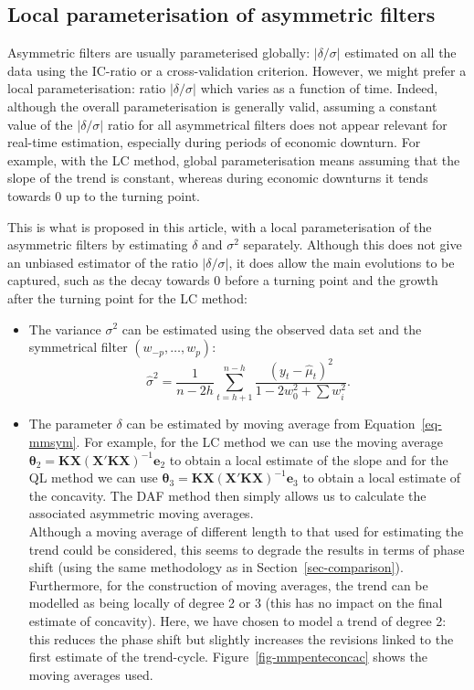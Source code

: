 \documentclass[
]{article}
\providecommand{\tightlist}{%
  \setlength{\itemsep}{0pt}\setlength{\parskip}{0pt}}\usepackage{longtable,booktabs,array}
\newcommand\1{\mathds{1}}
\begin{document}
\hypertarget{sec-localic}{%
\subsection{Local parameterisation of asymmetric
filters}\label{sec-localic}}

Asymmetric filters are usually parameterised globally:
\(\lvert\delta/\sigma\rvert\) estimated on all the data using the
IC-ratio or a cross-validation criterion. However, we might prefer a
local parameterisation: ratio \(\lvert\delta/\sigma\rvert\) which varies
as a function of time. Indeed, although the overall parameterisation is
generally valid, assuming a constant value of the
\(\lvert\delta/\sigma\rvert\) ratio for all asymmetrical filters does
not appear relevant for real-time estimation, especially during periods
of economic downturn. For example, with the LC method, global
parameterisation means assuming that the slope of the trend is constant,
whereas during economic downturns it tends towards 0 up to the turning
point.

This is what is proposed in this article, with a local parameterisation
of the asymmetric filters by estimating \(\delta\) and \(\sigma^2\)
separately. Although this does not give an unbiased estimator of the
ratio \(\lvert\delta/\sigma\rvert\), it does allow the main evolutions
to be captured, such as the decay towards 0 before a turning point and
the growth after the turning point for the LC method:

\begin{itemize}
\tightlist
\item
  The variance \(\sigma^2\) can be estimated using the observed data set
  and the symmetrical filter \((w_{-p},\dots,w_p)\): \[
  \hat\sigma^2=\frac{1}{n-2h}\sum_{t=h+1}^{n-h}\frac{(y_t-\hat \mu_t)^2}{1-2w_0^2+\sum w_i^2}.
  \]
\item
  The parameter \(\delta\) can be estimated by moving average from
  Equation~\ref{eq-mmsym}. For example, for the LC method we can use the
  moving average
  \(\boldsymbol \theta_2=\boldsymbol K\boldsymbol X(\boldsymbol X'\boldsymbol K\boldsymbol X)^{-1}\boldsymbol e_{2}\)
  to obtain a local estimate of the slope and for the QL method we can
  use
  \(\boldsymbol \theta_3=\boldsymbol K\boldsymbol X(\boldsymbol X'\boldsymbol K\boldsymbol X)^{-1}\boldsymbol e_{3}\)
  to obtain a local estimate of the concavity. The DAF method then
  simply allows us to calculate the associated asymmetric moving
  averages.\\
  Although a moving average of different length to that used for
  estimating the trend could be considered, this seems to degrade the
  results in terms of phase shift (using the same methodology as in
  Section~\ref{sec-comparison}). Furthermore, for the construction of
  moving averages, the trend can be modelled as being locally of degree
  2 or 3 (this has no impact on the final estimate of concavity). Here,
  we have chosen to model a trend of degree 2: this reduces the phase
  shift but slightly increases the revisions linked to the first
  estimate of the trend-cycle. Figure~\ref{fig-mmpenteconcac} shows the
  moving averages used.
\end{itemize}
\end{document}
